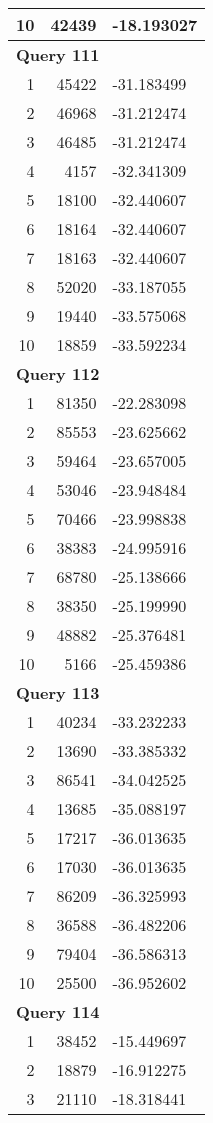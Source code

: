 \begin{longtable}[{p}]{@{}rrp{}@{}}
10 & 42439 & -18.193027 \\
\midrule
\multicolumn{3}{l}{\bfseries Query 111} \\
1 & 45422 & -31.183499 \\
2 & 46968 & -31.212474 \\
3 & 46485 & -31.212474 \\
4 & 4157 & -32.341309 \\
5 & 18100 & -32.440607 \\
6 & 18164 & -32.440607 \\
7 & 18163 & -32.440607 \\
8 & 52020 & -33.187055 \\
9 & 19440 & -33.575068 \\
10 & 18859 & -33.592234 \\
\midrule
\multicolumn{3}{l}{\bfseries Query 112} \\
1 & 81350 & -22.283098 \\
2 & 85553 & -23.625662 \\
3 & 59464 & -23.657005 \\
4 & 53046 & -23.948484 \\
5 & 70466 & -23.998838 \\
6 & 38383 & -24.995916 \\
7 & 68780 & -25.138666 \\
8 & 38350 & -25.199990 \\
9 & 48882 & -25.376481 \\
10 & 5166 & -25.459386 \\
\midrule
\multicolumn{3}{l}{\bfseries Query 113} \\
1 & 40234 & -33.232233 \\
2 & 13690 & -33.385332 \\
3 & 86541 & -34.042525 \\
4 & 13685 & -35.088197 \\
5 & 17217 & -36.013635 \\
6 & 17030 & -36.013635 \\
7 & 86209 & -36.325993 \\
8 & 36588 & -36.482206 \\
9 & 79404 & -36.586313 \\
10 & 25500 & -36.952602 \\
\midrule
\multicolumn{3}{l}{\bfseries Query 114} \\
1 & 38452 & -15.449697 \\
2 & 18879 & -16.912275 \\
3 & 21110 & -18.318441 \\

\end{longtable}
